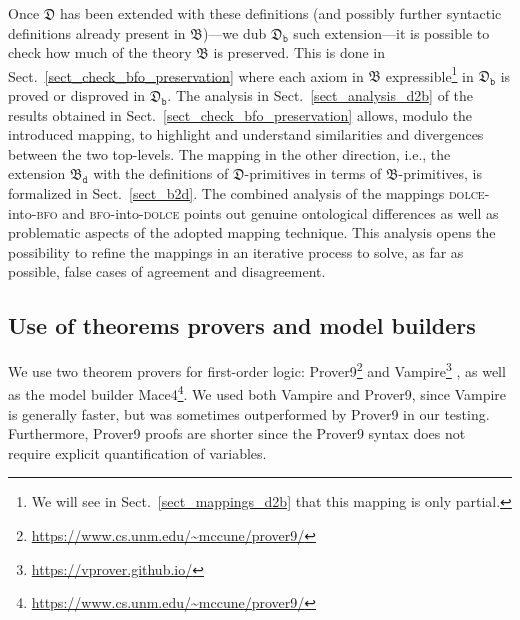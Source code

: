 \documentclass[ao]{iosart2x}
\newcommand{\dolce}{{\textsc{dolce}}}
\newcommand{\bfo}{{\textsc{bfo}}}
\newcommand {\thdolce} {\ensuremath{\mathfrak{D}}}
\newcommand {\thbfo} {\ensuremath{\mathfrak{B}}}
\newcommand {\thbfobdmap} {\ensuremath{\mathfrak{B}_\texttt{d}}}
\newcommand {\thdolcedbmap} {\ensuremath{\mathfrak{D}_\texttt{b}}}
\begin{document}
Once {$\thdolce$} has been extended with these definitions (and possibly further syntactic definitions already present in {$\thbfo$})---we dub $\thdolcedbmap$ such extension---it is possible to check how much of the theory $\thbfo$ is preserved. This is done in Sect.~\ref{sect_check_bfo_preservation} where each axiom in $\thbfo$ expressible\footnote{We will see in Sect.~\ref{sect_mappings_d2b} that this mapping is  only partial.} in $\thdolcedbmap$ is proved or disproved in $\thdolcedbmap$. The analysis in Sect.~\ref{sect_analysis_d2b} of the results obtained in Sect.~\ref{sect_check_bfo_preservation} allows, modulo the introduced mapping, to highlight and understand similarities and divergences between the two top-levels. The mapping in the other direction, i.e., the extension $\thbfobdmap$ with the definitions of {$\thdolce$}-primitives in terms of {$\thbfo$}-primitives, is formalized in Sect.~\ref{sect_b2d}. The combined analysis of the mappings {\dolce}-into-{\bfo} and {\bfo}-into-{\dolce} points out genuine ontological differences as well as problematic aspects of the adopted mapping technique. This analysis opens the possibility to refine the mappings in an iterative process to solve, as far as possible, false cases of agreement and disagreement.

\subsection{Use of theorems provers and model builders}

We use two theorem provers for first-order logic: Prover9\footnote{\url{https://www.cs.unm.edu/~mccune/prover9/}}  and Vampire\footnote{\url{https://vprover.github.io/}}%
, as well as the model builder Mace4\footnote{\url{https://www.cs.unm.edu/~mccune/prover9/}}.
We used both Vampire and Prover9, since Vampire is generally faster, but was sometimes outperformed by Prover9 in our testing. Furthermore, Prover9 proofs are shorter since the Prover9 syntax does not require explicit quantification of variables.

\end{document}
